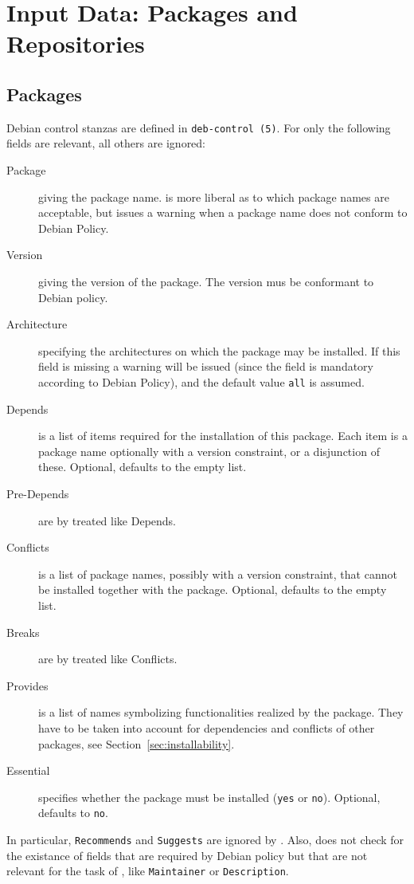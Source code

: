 \section{Input Data: Packages and Repositories}
\label{sec:data}
\subsection{Packages}
\label{sec:packages}
Debian control stanzas are defined in \texttt{deb-control (5)}. For
\debcheck{} only the following fields are relevant, all others are
ignored:
\begin{description}
\item[Package] giving the package name. \debcheck{} is more liberal as
  to which package names are acceptable, but issues a warning when a
  package name does not conform to Debian Policy.
\item[Version] giving the version of the package. The version mus be
  conformant to Debian policy.
\item[Architecture] specifying the architectures on which the package
  may be installed. If this field is missing a warning will be issued
  (since the field is mandatory according to Debian Policy), and the
  default value \texttt{all} is assumed.
\item[Depends] is a list of items required for the installation of
  this package. Each item is a package name optionally with a version
  constraint, or a disjunction of these. Optional, defaults to the
  empty list.
\item[Pre-Depends] are by \debcheck{} treated like Depends.
\item[Conflicts] is a list of package names, possibly with a version
  constraint, that cannot be installed together with the package. Optional,
  defaults to the empty list.
\item[Breaks] are by \debcheck{} treated like Conflicts.
\item[Provides] is a list of names symbolizing functionalities realized by the
  package. They have to be taken into account for dependencies and conflicts
  of other packages, see Section~\ref{sec:installability}.
\item[Essential] specifies whether the package must be installed
  (\texttt{yes} or \texttt{no}). Optional, defaults to \texttt{no}.
\end{description}

In particular, \texttt{Recommends} and \texttt{Suggests} are ignored
by \debcheck. Also, \debcheck{} does not check for the existance of
fields that are required by Debian policy but that are not relevant
for the task of \debcheck, like \texttt{Maintainer} or
\texttt{Description}.

